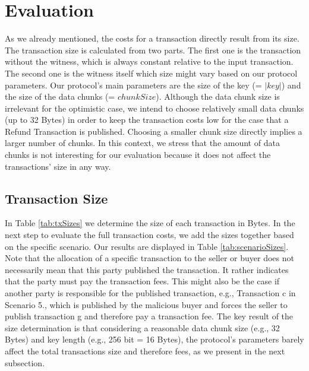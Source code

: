 \documentclass{cacthesis}
\newcounter{protocol}
\begin{document}
	    
	    \section{Evaluation}
	    As we already mentioned, the costs for a transaction directly result from its size. The transaction size is calculated from two parts. The first one is the transaction without the witness, which is always constant relative to the input transaction. The second one is the witness itself which size might vary based on our protocol parameters. Our protocol's main parameters are the size of the key (= $|key|$) and the size of the data chunks (= $chunkSize$). Although the data chunk size is irrelevant for the optimistic case, we intend to choose relatively small data chunks (up to 32 Bytes) in order to keep the transaction costs low for the case that a Refund Transaction is published. Choosing a smaller chunk size directly implies a larger number of chunks. In this context, we stress that the amount of data chunks is not interesting for our evaluation because it does not affect the transactions' size in any way. 
	    
	    \subsection{Transaction Size}
	    In Table \ref{tab:txSizes} we determine the size of each transaction in Bytes. In the next step to evaluate the full transaction costs, we add the sizes together based on the specific scenario. Our results are displayed in Table \ref{tab:scenarioSizes}. Note that the allocation of a specific transaction to the seller or buyer does not necessarily mean that this party published the transaction. It rather indicates that the party must pay the transaction fees. This might also be the case if another party is responsible for the published transaction, e.g., Transaction c in Scenario 5., which is published by the malicious buyer and forces the seller to publish transaction g and therefore pay a transaction fee. The key result of the size determination is that considering a reasonable data chunk size (e.g., 32 Bytes) and key length (e.g., 256 bit = 16 Bytes), the protocol's parameters barely affect the total transactions size and therefore fees, as we present in the next subsection.
	    
\end{document}
